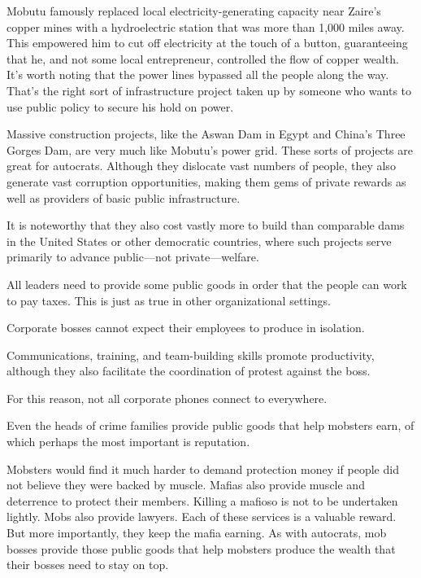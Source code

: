 \documentclass[10pt]{article}
\begin{document}
{\large Mobutu famously replaced local electricity-generating capacity near
Zaire's copper mines with a hydroelectric station that was more than 1,000 miles
away. This empowered him to cut off electricity at the touch of a button,
guaranteeing that he, and not some local entrepreneur, controlled the flow of
copper wealth. It's worth noting that the power lines bypassed all the people
along the way. That's the right sort of infrastructure project taken up by
someone who wants to use public policy to secure his hold on power.}

{\large Massive construction projects, like the Aswan Dam in Egypt and China's
Three Gorges Dam, are very much like Mobutu's power grid. These sorts of projects
are great for autocrats. Although they dislocate vast numbers of people, they
also generate vast corruption opportunities, making them gems of private rewards
as well as providers of basic public infrastructure.}

{\large It is noteworthy that they also cost vastly more to build than
comparable dams in the United States or other democratic countries, where such
projects serve primarily to advance public---not private---welfare.}

{\large All leaders need to provide some public goods in order that the people
can work to pay taxes. This is just as true in other organizational settings.}

{\large Corporate bosses cannot expect their employees to produce in isolation.}

{\large Communications, training, and team-building skills promote productivity,
although they also facilitate the coordination of protest against the boss.}

{\large For this reason, not all corporate phones connect to everywhere.}

{\large Even the heads of crime families provide public goods that help mobsters
earn, of which perhaps the most important is reputation.}

{\large Mobsters would find it much harder to demand protection money if people
did not believe they were backed by muscle. Mafias also provide muscle and
deterrence to protect their members. Killing a mafioso is not to be undertaken
lightly. Mobs also provide lawyers. Each of these services is a valuable reward.
But more importantly, they keep the mafia earning. As with autocrats, mob bosses
provide those public goods that help mobsters produce the wealth that their
bosses need to stay on top.}
\end{document}
